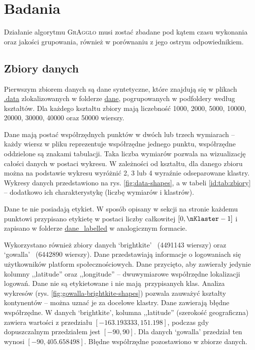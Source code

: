\documentclass[a4paper,twoside,12pt]{book}
\newcommand{\dataset}[1]{`#1'}
\newcommand{\gowalla}{\dataset{gowalla}}
\newcommand{\brightkite}{\dataset{brightkite}}
\newcommand{\procedura}[1]{\textsc{#1}}
\newcommand{\MojAlg}{\procedura{GrAgglo}}
\begin{document}
\chapter{Badania}
\label{sec:badania}

Działanie algorytmu \MojAlg{} musi zostać zbadane pod kątem czasu wykonania oraz jakości grupowania, również w porównaniu z jego ostrym odpowiednikiem.

\section{Zbiory danych}

Pierwszym zbiorem danych są dane syntetyczne, które znajdują się w plikach \url{.data} zlokalizowanych w folderze \url{dane}, pogrupowanych w podfoldery według kształtów. 
Dla każdego kształtu zbiory mają liczebność \num{1000}, \num{2000}, \num{5000}, \num{10000}, \num{20000}, \num{30000}, \num{40000} oraz \num{50000} wierszy.

Dane mają postać współrzędnych punktów w dwóch lub trzech wymiarach -- każdy wiersz w pliku reprezentuje współrzędne jednego punktu, współrzędne oddzielone są znakami tabulacji. Taka liczba wymiarów pozwala na wizualizację całości danych w postaci wykresu. W zależności od kształtu, dla danego zbioru można na podstawie wykresu wyróżnić 2, 3 lub 4 wyraźnie odseparowane klastry.
Wykresy danych przedstawiono na rys. \ref{fig:data-shapes}, a w tabeli \ref{id:tab:zbiory} -- dodatkowo ich charakterystykę (liczbę wymiarów i klastrów).

Dane te nie posiadają etykiet. W sposób opisany w sekcji na stronie \pageref{sec:etykietowanie-danych} każdemu punktowi przypisano etykietę w postaci liczby całkowitej $[0, \nKlaster-1]$ i zapisano w folderze \url{dane_labelled} w analogicznym formacie.

Wykorzystano również zbiory danych \brightkite\ \cite{bib:brightkite} (\num{4491143} wierszy) oraz \gowalla\ \cite{bib:gowalla} (\num{6442890} wierszy).
Dane przedstawiają informacje o logowaniach się użytkowników platform społecznościowych.
Dane przycięto, aby zawierały jedynie kolumny ,,latitude'' oraz ,,longitude'' -- dwuwymiarowe współrzędne lokalizacji logowań. Dane nie są etykietowane i nie mają przypisanych klas. 
%
Analiza wykresów (rys. \ref{fig:gowalla-brightkite-shapes}) pozwala zauważyć kształty kontynentów -- można uznać je za docelowe klastry. 
%
Dane zawierają błędne współrzędne. W danych \brightkite{}, kolumna ,,latitude'' (szerokość geograficzna) zawiera wartości z przedziału $[\num{-163.193333}, \num{151.198}]$, podczas gdy dopuszczalnym przedziałem jest $[-90, 90]$. Dla danych \gowalla{} przedział ten wynosi $[-90, \num{405.658498}]$. Błędne współrzędne pozostawiono w zbiorze danych.
\end{document}
